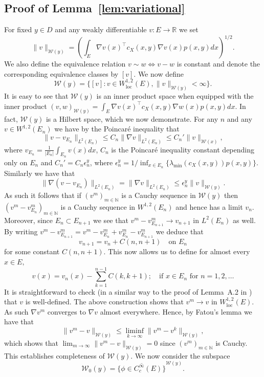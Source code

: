 \documentclass{article}
\theoremstyle{plain}
\theoremstyle{definition}
\newcommand{\R}{\mathbb{R}}
\newcommand{\N}{\mathbb{N}}
\newcommand{\Wcal}{{\mathcal W}}
\numberwithin{lem}{section}
\begin{document}
\subsection{Proof of Lemma~\ref{lem:variational}} \label{sec:proofs_variational}
For fixed $y \in D$ and any weakly differentiable $v:E \to \R$ we set
\[\|v\|_{\Wcal(y)} = \left(\int_E \nabla v(x)^\top c_X(x,y)\nabla v(x)p(x,y)dx\right)^{1/2}.\] We also define the equivalence relation $v \sim w \iff v-w$ is constant and denote the corresponding equivalence classes by $[v]$. We now define 
\[\Wcal(y) = \{ [v]: v \in W^{1,2}_{\mathrm{loc}}(E),\|v\|_{\Wcal(y)} < \infty\}.\]
It is easy to see that $\Wcal(y)$ is an inner product space when equipped with the inner product $(v,w)_{\Wcal(y)} = \int_E \nabla v(x)^\top c_X(x,y)\nabla w(x)p(x,y)dx$. In fact, $\Wcal(y)$ is a Hilbert space, which we now demonstrate. For any $n$ and any $v \in W^{1,2}(E_n)$ we have by the Poincar\'e inequality \cite[Theorem~5.8.1]{evanspartial2010} that 
\[\|v-v_{E_n}\|_{L^2(E_n)} \leq C_n\|\nabla v\|_{L^2(E_n)} \leq C_n'\|v\|_{\Wcal(x)},\]
where $v_{E_n} = \frac{1}{|E_n|}\int_{E_n}v(x)dx$, $C_n$ is the Poincar\'e inequality constant depending only on $E_n$ and $C_n' = C_n\epsilon_n^y$, where $\epsilon_n^y = 1/\inf_{x \in E_n} \{\lambda_{\min}(c_X(x,y))p(x,y)\}$.
Similarly we have that 
\[\|\nabla (v-v_{E_n})\|_{L^2(E_n)} = \|\nabla v\|_{L^2(E_n)} \leq \epsilon_n^y \|v\|_{\Wcal(y)}.\] As such it follows that if $(v^m)_{m \in \N}$ is a Cauchy sequence in $\Wcal(y)$ then $(v^m - v^m_{E_n})_{m \in \N}$ is a Cauchy sequence in $W^{1,2}(E_n)$ and hence has a limit $v_n$. Moreover, since $E_n \subset E_{n+1}$ we see that $v^m - v^m_{E_{n+1}} \to v_{n+1}$ in $L^2(E_n)$ as well. By writing $v^m - v^m_{E_{n+1}} = v^m - v^m_{E_{n}} + v^m_{E_{n}} - v^m_{E_{n+1}}$ we deduce that
\[v_{n+1} = v_n + C(n,n+1) \quad \text{on }E_n\]
for some constant $C(n,n+1)$. This now allows us to define for almost every $x \in E,$
\[v(x) = v_n(x) - \sum_{k=1}^{n-1} C(k,k+1); \quad \text{if }x \in E_n \text{ for } n=1,2,\dots\]
It is straightforward to check (in a similar way to the proof of Lemma~A.2 in \cite{kardaras2021ergodic}) that $v$ is well-defined. The above construction shows that $v^m \to v$ in $W^{1,2}_{\mathrm{loc}}(E)$. As such $\nabla v^m$ converges to $\nabla v$ almost everywhere. Hence, by Fatou's lemma we have that 
\[\|v^m - v\|_{\Wcal(y)} \leq \liminf_{k \to \infty}\|v^m-v^k\|_{\Wcal(y)},\]
which shows that $\lim_{m \to \infty} \|v^m- v\|_{\Wcal(y)} = 0$ since $(v^m)_{m \in \N}$ is Cauchy. This establishes completeness of $\Wcal(y)$. 
We now consider the subspace \[\Wcal_0(y) = \overline{\{\phi \in C_c^\infty(E)\}}^{\Wcal(y)}.\]
\end{document}
